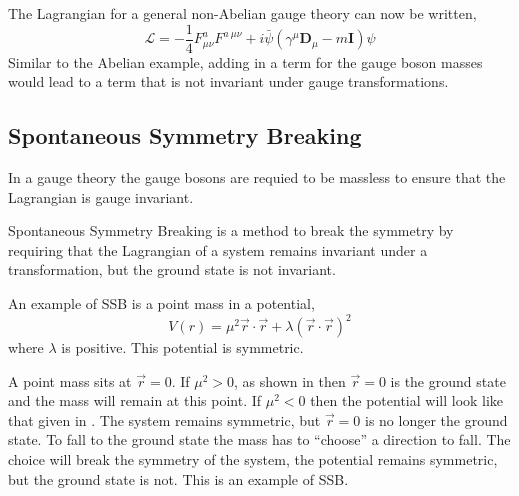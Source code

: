 The Lagrangian for a general non-Abelian gauge theory can now be written,
\begin{equation}
\mathcal{L} = 
- \frac{1}{4} F^{a}_{\mu\nu} F^{a~\mu\nu}
+ i\bar{\psi}( \gamma^{\mu} \mathbf{D}_{\mu} - m\mathbf{I} )\psi 
\label{eq:generallagrangian}
\end{equation}
Similar to the Abelian example, adding in a term for the gauge boson masses
would lead to a term that is not invariant under gauge transformations.

\subsection{Spontaneous Symmetry Breaking}
\label{sec:ssb}
In a gauge theory the gauge bosons are requied to be massless to ensure that the
Lagrangian is gauge invariant.

Spontaneous Symmetry Breaking is a method to break the symmetry by requiring
that the Lagrangian of a system remains invariant under a transformation, but
the ground state is not invariant.

An example of \ac{SSB} is a point mass in a potential,
\begin{equation}
V(r) = \mu^{2} \vec{r} \cdot \vec{r} + \lambda ( \vec{r} \cdot \vec{r} )^{2}
\end{equation}
where $\lambda$ is positive. This potential is symmetric. 

A point mass sits at $\vec{r}=0$. If $\mu^{2}>0$, as shown in
 then $\vec{r}=0$ is the ground state and
the mass will remain at this point.
If $\mu^{2}<0$ then the potential will look like that given in
. The system remains symmetric, but $\vec{r}=0$ is no longer
the ground state. To fall to the ground state the mass has to ``choose'' a
direction to fall. The choice will break the symmetry of the system, the
potential remains symmetric, but the ground state is not. This is an example of
\ac{SSB}.

